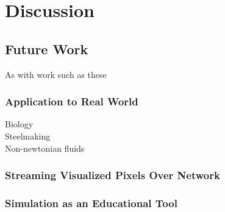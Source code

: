 \section{Discussion}\label{sec:discussion}

\subsection{Future Work}

As with work such as these

\subsubsection{Application to Real World}

Biology \\
Steelmaking \\
Non-newtonian fluids \\



%

\subsubsection{Streaming Visualized Pixels Over Network}

\subsubsection{Simulation as an Educational Tool}
%
%


